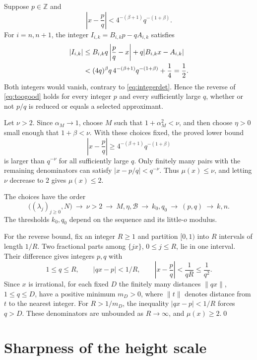 \documentclass{amsart}
\numberwithin{equation}{section}
\newcommand{\Z}{\mathbb Z}
\begin{document}
Suppose $p\in\Z$ and
\begin{equation}\label{eq:toogood}
\left|x-\frac pq\right|
 <4^{-(\beta+1)}q^{-(1+\beta)}.
\end{equation}
For $i=n,n+1$, the integer $I_{i,k}=B_{i,k}p-qA_{i,k}$ satisfies
\begin{align}
|I_{i,k}|
&\le B_{i,k}q\left|\frac pq-x\right|
      +q|B_{i,k}x-A_{i,k}|\notag\\
&<(4q)^\beta q\,4^{-(\beta+1)}q^{-(1+\beta)}+\frac14
 =\frac12.\label{eq:contradiction}
\end{align}
Both integers would vanish, contrary to \eqref{eq:integerdet}.
Hence the reverse of \eqref{eq:toogood} holds for every integer $p$
and every sufficiently large $q$, whether or not $p/q$ is reduced or
equals a selected approximant.

Let $\nu>2$. Since $\alpha_M\to1$, choose
$M$ such that $1+\alpha_M^2<\nu$, and then choose $\eta>0$ small
enough that $1+\beta<\nu$. With these choices fixed, the proved
lower bound
\[
\left|x-\frac pq\right|\ge4^{-(\beta+1)}q^{-(1+\beta)}
\]
is larger than $q^{-\nu}$ for all sufficiently large $q$.
Only finitely many pairs with the remaining denominators can satisfy
$|x-p/q|<q^{-\nu}$. Thus $\mu(x)\le\nu$, and letting $\nu$
decrease to $2$ gives $\mu(x)\le2$.

The choices have the order
\begin{equation}\label{eq:quantifiers}
\bigl((\lambda_j)_{j\ge0},N\bigr)
\ \longrightarrow\ \nu>2
\ \longrightarrow\ M,\eta,\mathcal B
\ \longrightarrow\ k_0,q_0
\ \longrightarrow\ (p,q)
\ \longrightarrow\ k,n.
\end{equation}
The thresholds $k_0,q_0$ depend on the sequence and its little-$o$
modulus.

For the reverse bound, fix an integer $R\ge1$ and partition $[0,1)$
into $R$ intervals of length $1/R$.
Two fractional parts among $\{jx\}$, $0\le j\le R$, lie in one interval.
Their difference gives integers $p,q$ with
\[
1\le q\le R,\qquad |qx-p|<1/R,\qquad
\left|x-\frac pq\right|<\frac1{qR}\le\frac1{q^2}.
\]
Since $x$ is irrational, for each fixed $D$ the finitely many
distances $\|qx\|$, $1\le q\le D$, have a positive minimum $m_D>0$,
where $\|t\|$ denotes distance from $t$ to the nearest integer.
For $R>1/m_D$, the inequality $|qx-p|<1/R$ forces $q>D$.
These denominators are unbounded as $R\to\infty$, and
$\mu(x)\ge2$.\qed

\section{Sharpness of the height scale}
\end{document}
